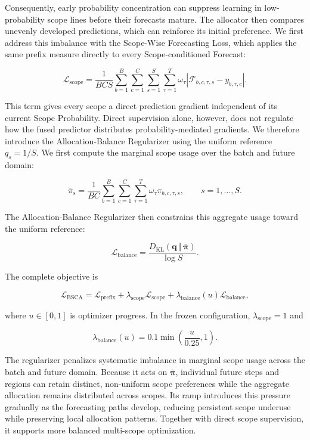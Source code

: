 Consequently, early probability concentration can suppress learning in low-probability scope lines before their forecasts mature. The allocator then compares unevenly developed predictions, which can reinforce its initial preference. We first address this imbalance with the Scope-Wise Forecasting Loss, which applies the same prefix measure directly to every Scope-conditioned Forecast:

\[
\mathcal L_{\mathrm{scope}}
=
\frac{1}{BCS}
\sum_{b=1}^{B}
\sum_{c=1}^{C}
\sum_{s=1}^{S}
\sum_{\tau=1}^{T}
\omega_\tau
\left|
\mathcal F_{b,c,\tau,s}-y_{b,\tau,c}
\right|.
\]


This term gives every scope a direct prediction gradient independent of its current Scope Probability. Direct supervision alone, however, does not regulate how the fused predictor distributes probability-mediated gradients. We therefore introduce the Allocation-Balance Regularizer using the uniform reference $q_s=1/S$. We first compute the marginal scope usage over the batch and future domain:

\[
\bar{\pi}_s
=
\frac{1}{BC}
\sum_{b=1}^{B}
\sum_{c=1}^{C}
\sum_{\tau=1}^{T}
\omega_\tau\pi_{b,c,\tau,s},
\qquad
s=1,\ldots,S.
\]


The Allocation-Balance Regularizer then constrains this aggregate usage toward the uniform reference:

\[
\mathcal L_{\mathrm{balance}}
=
\frac{
D_{\mathrm{KL}}\!\left(
\mathbf q\,\Vert\,\bar{\boldsymbol\pi}
\right)
}{
\log S
}.
\]


The complete objective is

\[
\mathcal L_{\mathrm{BSCA}}
=
\mathcal L_{\mathrm{prefix}}
+
\lambda_{\mathrm{scope}}
\mathcal L_{\mathrm{scope}}
+
\lambda_{\mathrm{balance}}(u)
\mathcal L_{\mathrm{balance}},
\]


where $u\in[0,1]$ is optimizer progress. In the frozen configuration, $\lambda_{\mathrm{scope}}=1$ and

\[
\lambda_{\mathrm{balance}}(u)
=
0.1
\min\!\left(
\frac{u}{0.25},1
\right).
\]


The regularizer penalizes systematic imbalance in marginal scope usage across the batch and future domain. Because it acts on $\bar{\boldsymbol\pi}$, individual future steps and regions can retain distinct, non-uniform scope preferences while the aggregate allocation remains distributed across scopes. Its ramp introduces this pressure gradually as the forecasting paths develop, reducing persistent scope underuse while preserving local allocation patterns. Together with direct scope supervision, it supports more balanced multi-scope optimization.
